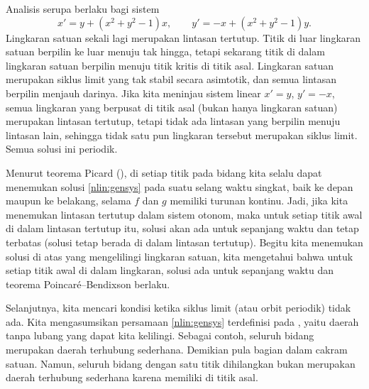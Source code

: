 Analisis serupa berlaku bagi sistem
\begin{equation*}
x' = y + {(x^2+y^2-1)} x, \qquad
y' = -x + {(x^2+y^2-1)} y.
\end{equation*}
Lingkaran satuan sekali lagi merupakan lintasan tertutup. Titik di luar
lingkaran satuan berpilin ke luar menuju tak hingga, tetapi sekarang titik
di dalam lingkaran satuan berpilin menuju titik kritis di titik asal.
Lingkaran satuan merupakan siklus limit yang tak stabil secara asimtotik,
dan semua lintasan berpilin menjauh darinya.
Jika kita meninjau sistem linear $x' = y$, $y' = -x$, semua lingkaran yang
berpusat di titik asal (bukan hanya lingkaran satuan) merupakan lintasan
tertutup, tetapi tidak ada lintasan yang berpilin menuju lintasan lain,
sehingga tidak satu pun lingkaran tersebut merupakan siklus limit.
Semua solusi ini periodik.

Menurut teorema Picard (), di setiap titik pada bidang
kita selalu dapat menemukan solusi \eqref{nlin:gensys} pada suatu selang waktu
singkat, baik ke depan maupun ke belakang, selama $f$ dan $g$ memiliki turunan kontinu.
Jadi, jika kita menemukan lintasan tertutup dalam sistem otonom, maka untuk
setiap titik awal di dalam lintasan tertutup itu, solusi akan ada untuk
sepanjang waktu dan tetap terbatas (solusi tetap berada di dalam lintasan
tertutup). Begitu kita menemukan solusi di atas yang mengelilingi lingkaran
satuan, kita mengetahui bahwa untuk setiap titik awal di dalam lingkaran,
solusi ada untuk sepanjang waktu dan teorema Poincar\'e--Bendixson berlaku.

\medskip

Selanjutnya, kita mencari kondisi ketika siklus limit (atau orbit periodik)
tidak ada. Kita mengasumsikan persamaan \eqref{nlin:gensys} terdefinisi pada
\emph{}, yaitu daerah tanpa lubang yang
dapat kita kelilingi. Sebagai contoh, seluruh bidang merupakan daerah
terhubung sederhana. Demikian pula bagian dalam cakram satuan. Namun, seluruh
bidang dengan satu titik dihilangkan bukan merupakan daerah terhubung
sederhana karena memiliki  di titik asal.

